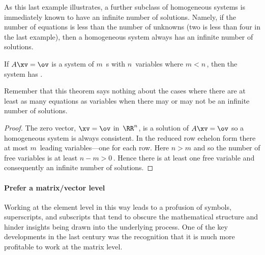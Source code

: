 As this last example illustrates, a further subclass of homogeneous systems is immediately known to have an infinite number of solutions.
Namely, if the number of equations is less than the number of unknowns (two is less than four in the last example), then a homogeneous system always has an infinite number of solutions.


\begin{theorem} \label{thm:feweqns} 
If \(A\xv=\ov\) is a  system of \(m\)~s with \(n\)~variables where \(m<n\)\,, then the system has .
\end{theorem}

Remember that this theorem says nothing about the cases where there are at least as many equations as variables when there may or may not be an infinite number of solutions.

\begin{proof} 
The zero vector, \(\xv=\ov\) in~\(\RR^n\), is a solution of \(A\xv=\ov\) so a homogeneous system is always consistent.
In the reduced row echelon form there at most \(m\)~leading variables---one for each row.
Here \(n>m\) and so the number of free variables is at least \(n-m>0\)\,.
Hence there is at least one free variable and consequently an infinite number of solutions.
\end{proof}




\paragraph{Prefer a matrix/vector level}
\begin{quoted}{\cite[\S2]{Higham2015b}}
Working at the element level in this way leads to a profusion of symbols, superscripts, and subscripts that tend to obscure the mathematical structure and hinder insights being drawn into the underlying process.
One of the key developments in the last century was the recognition that it is much more profitable to work at the matrix level.
\end{quoted}


